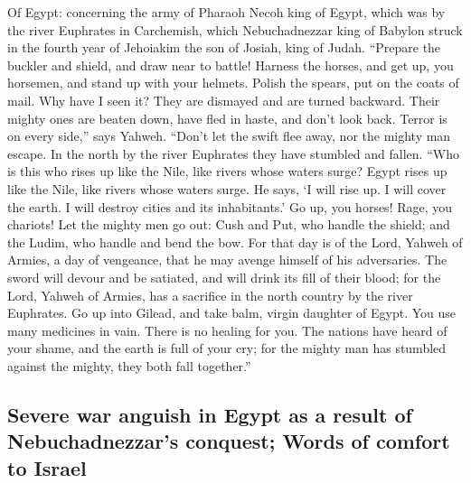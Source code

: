  Of Egypt: concerning the army of Pharaoh Necoh king of
Egypt, which was by the river Euphrates in Carchemish, which
Nebuchadnezzar king of Babylon struck in the fourth year of Jehoiakim
the son of Josiah, king of Judah.  ``Prepare the buckler
and shield, and draw near to battle!  Harness the horses,
and get up, you horsemen, and stand up with your helmets. Polish the
spears, put on the coats of mail.  Why have I seen it?
They are dismayed and are turned backward. Their mighty ones are beaten
down, have fled in haste, and don't look back. Terror is on every
side,'' says Yahweh.  ``Don't let the swift flee away, nor
the mighty man escape. In the north by the river Euphrates they have
stumbled and fallen.  ``Who is this who rises up like the
Nile, like rivers whose waters surge?  Egypt rises up like
the Nile, like rivers whose waters surge. He says, `I will rise up. I
will cover the earth. I will destroy cities and its inhabitants.'
 Go up, you horses! Rage, you chariots! Let the mighty men
go out: Cush and Put, who handle the shield; and the Ludim, who handle
and bend the bow.  For that day is of the Lord, Yahweh of
Armies, a day of vengeance, that he may avenge himself of his
adversaries. The sword will devour and be satiated, and will drink its
fill of their blood; for the Lord, Yahweh of Armies, has a sacrifice in
the north country by the river Euphrates.  Go up into
Gilead, and take balm, virgin daughter of Egypt. You use many medicines
in vain. There is no healing for you.  The nations have
heard of your shame, and the earth is full of your cry; for the mighty
man has stumbled against the mighty, they both fall together.''

\hypertarget{severe-war-anguish-in-egypt-as-a-result-of-nebuchadnezzars-conquest-words-of-comfort-to-israel}{%
\subsection{Severe war anguish in Egypt as a result of Nebuchadnezzar's
conquest; Words of comfort to
Israel}\label{severe-war-anguish-in-egypt-as-a-result-of-nebuchadnezzars-conquest-words-of-comfort-to-israel}}

